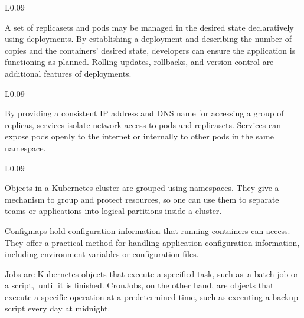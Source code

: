 \begin{wrapfigure}{L}{0.09\textwidth}
        
	  \label{fig:deploy}
\end{wrapfigure}

A set of replicasets and pods may be managed in the desired state declaratively using deployments. By establishing a deployment and describing the number of copies and the containers' desired state, developers can ensure the application is functioning as planned. Rolling updates, rollbacks, and version control are additional features of deployments.


\begin{wrapfigure}{L}{0.09\textwidth}
        
	  \label{fig:svc}
\end{wrapfigure}

By providing a consistent IP address and DNS name for accessing a group of replicas, services isolate network access to pods and replicasets. Services can expose pods openly to the internet or internally to other pods in the same namespace.

\begin{wrapfigure}{L}{0.09\textwidth}
    \begin{center}
            
    	  \label{fig:ns}
      \end{center}
    \begin{center}
        
	  \label{fig:cm}
  \end{center}
   \begin{center}
        
	  \label{fig:cronjob}
  \end{center}
\end{wrapfigure}

Objects in a Kubernetes cluster are grouped using namespaces. They give a mechanism to group and protect resources, so one can use them to separate teams or applications into logical partitions inside a cluster.

Configmaps hold configuration information that running containers can access. They offer a practical method for handling application configuration information, including environment variables or configuration files.

Jobs are Kubernetes objects that execute a specified task, such as a batch job or a script, until it is finished. CronJobs, on the other hand, are objects that execute a specific operation at a predetermined time, such as executing a backup script every day at midnight.

